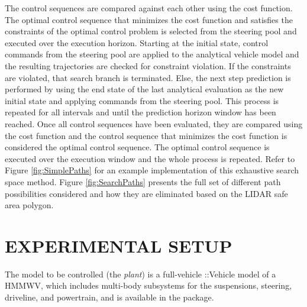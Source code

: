 \documentclass[12pt,onecolumn]{report}
\newcommand{\CHRONO}{{\sffamily{{Chrono}}}}
\newcommand{\ChronoVehicle}{{\sffamily{Chrono}}::Vehicle}
\begin{document}
The control sequences are compared against each other using the cost function. The optimal control sequence that minimizes the cost function and satisfies the constraints of the optimal control problem is selected from the steering pool and executed over the execution horizon. Starting at the initial state, control commands from the steering pool are applied to the analytical vehicle model and the resulting trajectories are checked for constraint violation. If the constraints are violated, that search branch is terminated. Else, the next step prediction is performed by using the end state of the last analytical evaluation as the new initial state and applying commands from the steering pool. This process is repeated for all intervals and until the prediction horizon window has been reached. Once all control sequences have been evaluated, they are compared using the cost function and the control sequence that minimizes the cost function is considered the optimal control sequence. The optimal control sequence is executed over the execution window and the whole process is repeated. Refer to Figure \ref{fig:SimplePaths} for an example implementation of this exhaustive search space method. Figure \ref{fig:SearchPaths} presents the full set of different path possibilities considered and how they are eliminated based on the LIDAR safe area polygon.


\chapter{EXPERIMENTAL SETUP}\label{c:ExpSetup}

The model to be controlled (the {\em plant}) is a full-vehicle {\ChronoVehicle} model of a HMMWV, which includes multi-body subsystems for the suspensions, steering, driveline, and powertrain, and is available in the {\CHRONO} package.
\end{document}
